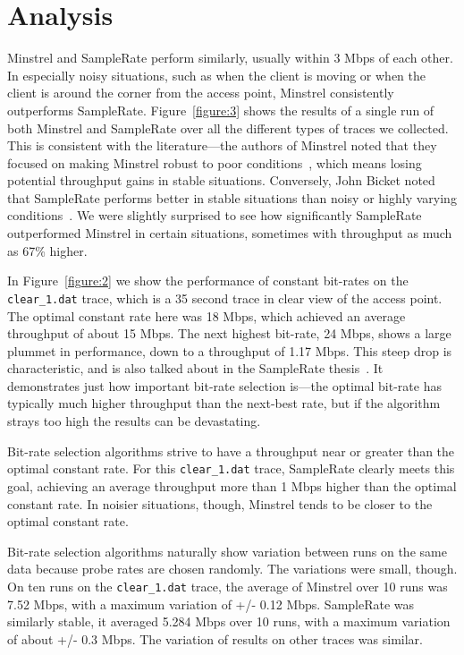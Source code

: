 \documentclass[letterpaper,twocolumn,10pt]{article}
\begin{document}
\section{Analysis}

Minstrel and SampleRate perform similarly, usually within 3 Mbps of each other. In especially noisy situations, such as when the client is moving or when the client is around the corner from the access point, Minstrel consistently outperforms SampleRate. Figure~\ref{figure:3} shows the results of a single run of both Minstrel and SampleRate over all the different types of traces we collected. This is consistent with the literature---the authors of Minstrel noted that they focused on making Minstrel robust to poor conditions~\cite{minstrel}, which means losing potential throughput gains in stable situations. Conversely, John Bicket noted that SampleRate performs better in stable situations than noisy or highly varying conditions~\cite{samplerate}. We were slightly surprised to see how significantly SampleRate outperformed Minstrel in certain situations, sometimes with throughput as much as 67\% higher. 

In Figure~\ref{figure:2} we show the performance of constant bit-rates on the \texttt{clear\_1.dat} trace, which is a 35 second trace in clear view of the access point. The optimal constant rate here was 18 Mbps, which achieved an average throughput of about 15 Mbps. The next highest bit-rate, 24 Mbps, shows a large plummet in performance, down to a throughput of 1.17 Mbps. This steep drop is characteristic, and is also talked about in the SampleRate thesis~\cite{samplerate}. It demonstrates just how important bit-rate selection is---the optimal bit-rate has typically much higher throughput than the next-best rate, but if the algorithm strays too high the results can be devastating. 

Bit-rate selection algorithms strive to have a throughput near or greater than the optimal constant rate. For this \texttt{clear\_1.dat} trace, SampleRate clearly meets this goal, achieving an average throughput more than 1 Mbps higher than the optimal constant rate. In noisier situations, though, Minstrel tends to be closer to the optimal constant rate. 

Bit-rate selection algorithms naturally show variation between runs on the same data because probe rates are chosen randomly. The variations were small, though. On ten runs on the \texttt{clear\_1.dat} trace, the average of Minstrel over 10 runs was 7.52 Mbps, with a maximum variation of +/- 0.12 Mbps. SampleRate was similarly stable, it averaged 5.284 Mbps over 10 runs, with a maximum variation of about +/- 0.3 Mbps. The variation of results on other traces was similar.
\end{document}
